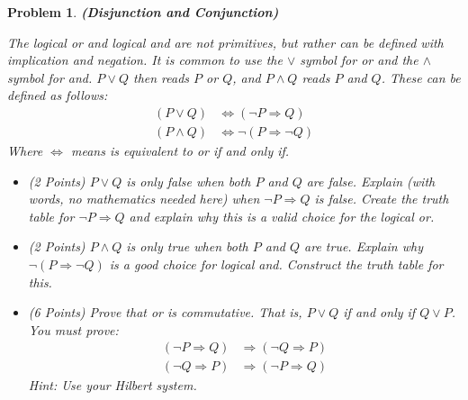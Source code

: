 \documentclass{article}
\theoremstyle{normal}
\newtheorem{problem}{Problem}
\begin{document}
    \begin{problem}
        \textbf{(Disjunction and Conjunction)}
        \par\hfill\par
        The \textit{logical or} and \textit{logical and} are not primitives,
        but rather can be defined with implication and negation.
        It is common to use the
        $\lor$ symbol for \textit{or} and the $\land$ symbol for \textit{and}.
        $P\lor{Q}$ then reads $P$ \textit{or} $Q$, and $P\land{Q}$ reads
        $P$ \textit{and} $Q$. These can be defined as follows:
        \begin{align}
            (P\lor{Q})&\Leftrightarrow(\neg{P}\Rightarrow{Q})\\
            (P\land{Q})&\Leftrightarrow\neg(P\Rightarrow\neg{Q})
        \end{align}
        Where $\Leftrightarrow$ means \textit{is equivalent to} or
        \textit{if and only if}.
        \begin{itemize}
            \item (2 Points) $P\lor{Q}$ is only false when both $P$ and $Q$ are
                false. Explain (with words, no mathematics needed here) when
                $\neg{P}\Rightarrow{Q}$ is false. Create the truth table for
                $\neg{P}\Rightarrow{Q}$ and explain why this is a valid choice
                for the logical or.
            \item (2 Points) $P\land{Q}$ is only true when both $P$ and $Q$ are
                true. Explain why $\neg(P\Rightarrow\neg{Q})$ is a good choice
                for logical and. Construct the truth table for this.
            \item (6 Points) Prove that \textit{or} is commutative. That is,
                $P\lor{Q}$ if and only if $Q\lor{P}$. You must prove:
                \begin{align}
                    (\neg{P}\Rightarrow{Q})&\Rightarrow(\neg{Q}\Rightarrow{P})\\
                    (\neg{Q}\Rightarrow{P})&\Rightarrow(\neg{P}\Rightarrow{Q})
                \end{align}
                Hint: Use your Hilbert system.
        \end{itemize}
    \end{problem}
\end{document}
